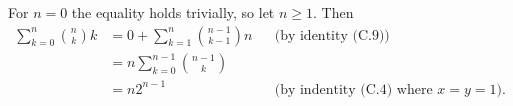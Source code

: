 \starred
For $n=0$ the equality holds trivially, so let $n\ge1$.
Then
\begin{align*}
    \sum_{k=0}^n\binom{n}{k}k &= 0+\sum_{k=1}^n\binom{n-1}{k-1}n && \text{(by identity (C.9))} \\
    &= n\sum_{k=0}^{n-1}\binom{n-1}{k} \\[1mm]
    &= n2^{n-1} && \text{(by indentity (C.4) where $x=y=1$)}.
\end{align*}
